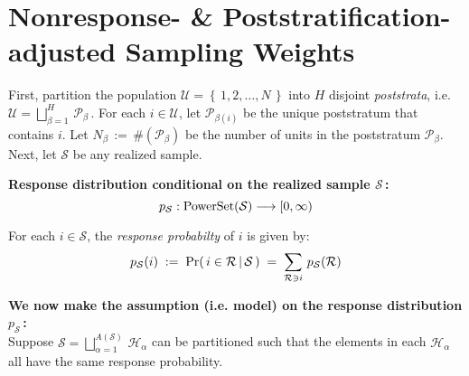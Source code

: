 

\section{Nonresponse- \& Poststratification-adjusted Sampling Weights}
\setcounter{theorem}{0}
\setcounter{equation}{0}


\renewcommand{\theenumi}{\roman{enumi}}
\renewcommand{\labelenumi}{\textnormal{(\theenumi)}$\;\;$}


First, partition the population $\mathcal{U} = \left\{\,1,2,\ldots,N\,\right\}$ into $H$ disjoint \emph{poststrata}, i.e.\; 
$\mathcal{U} = \displaystyle{\bigsqcup_{\beta=1}^{H}}\,\mathcal{P}_{\beta}$\,.  For each $i \in \mathcal{U}$, let $\mathcal{P}_{\beta(i)}$ be the unique poststratum that contains $i$.  Let $N_{\beta} \,:=\, \#(\mathcal{P}_{\beta})$ be the number of units in the poststratum $\mathcal{P}_{\beta}$.  \\

\noindent
Next, let $\mathcal{S}$ be any realized sample. \\

\vskip 0.8cm
\begin{center}
\begin{minipage}{6in}
\noindent
\textbf{Response distribution conditional on the realized sample $\mathcal{S}$\,:}
\begin{equation*}
p_{\mathcal{S}} : \textnormal{PowerSet}(\mathcal{S}) \longrightarrow [0,\infty)
\end{equation*}

\noindent
For each $i \in \mathcal{S}$, the \emph{response probabilty} of $i$ is given by:
\begin{equation*}
p_{\mathcal{S}}\!\left(i\right)
\; := \;
\textnormal{Pr}\!\left(\,i\in\mathcal{R}\,|\,\mathcal{S}\,\right)
\; = \; 
\sum_{\mathcal{R}\ni i}\,p_{\mathcal{S}}\!\left(\mathcal{R}\right)
\end{equation*}

\noindent
\textbf{We now make the assumption (i.e. model) on the response distribution $p_{\mathcal{S}}$\,:}\\
Suppose $\mathcal{S} = \displaystyle{\bigsqcup_{\alpha=1}^{A(\mathcal{S})}}\,\mathcal{H}_{\alpha}$ can be partitioned such that the elements in each $\mathcal{H}_{\alpha}$ all have the same response probability. \\
\end{minipage}
\end{center}
\vskip 0.5cm

